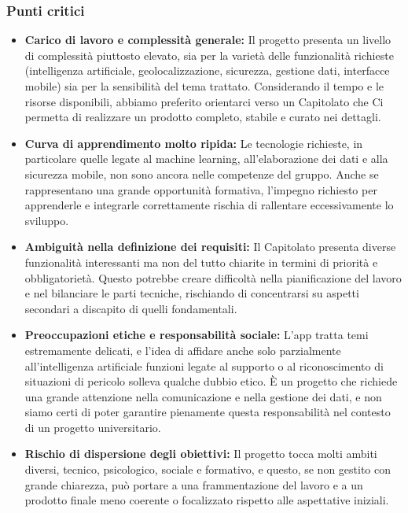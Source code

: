 \documentclass[a4paper,12pt]{article}
\begin{document}
\subsubsection{Punti critici}
\begin{itemize}
    \item \textbf{Carico di lavoro e complessità generale:} Il progetto presenta un livello di complessità piuttosto elevato, sia per la varietà delle funzionalità richieste (intelligenza artificiale, geolocalizzazione, sicurezza, gestione dati, interfacce mobile) sia per la sensibilità del tema trattato. Considerando il tempo e le risorse disponibili, abbiamo preferito orientarci verso un Capitolato che Ci permetta di realizzare un prodotto completo, stabile e curato nei dettagli.
    \item \textbf{Curva di apprendimento molto ripida:} Le tecnologie richieste, in particolare quelle legate al machine learning, all’elaborazione dei dati e alla sicurezza mobile, non sono ancora nelle competenze del gruppo. Anche se rappresentano una grande opportunità formativa, l’impegno richiesto per apprenderle e integrarle correttamente rischia di rallentare eccessivamente lo sviluppo.
    \item \textbf{Ambiguità nella definizione dei requisiti:} Il Capitolato presenta diverse funzionalità interessanti ma non del tutto chiarite in termini di priorità e obbligatorietà. Questo potrebbe creare difficoltà nella pianificazione del lavoro e nel bilanciare le parti tecniche, rischiando di concentrarsi su aspetti secondari a discapito di quelli fondamentali.
    \item \textbf{Preoccupazioni etiche e responsabilità sociale:} L’app tratta temi estremamente delicati, e l’idea di affidare anche solo parzialmente all’intelligenza artificiale funzioni legate al supporto o al riconoscimento di situazioni di pericolo solleva qualche dubbio etico. È un progetto che richiede una grande attenzione nella comunicazione e nella gestione dei dati, e non siamo certi di poter garantire pienamente questa responsabilità nel contesto di un progetto universitario.
    \item \textbf{Rischio di dispersione degli obiettivi:} Il progetto tocca molti ambiti diversi, tecnico, psicologico, sociale e formativo, e questo, se non gestito con grande chiarezza, può portare a una frammentazione del lavoro e a un prodotto finale meno coerente o focalizzato rispetto alle aspettative iniziali.
\end{itemize}
\end{document}
